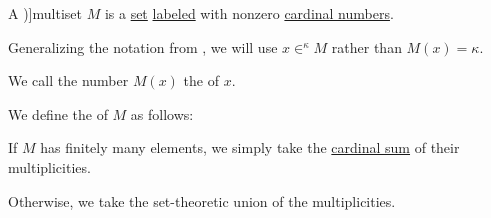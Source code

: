 \begin{definition}\label{def:multiset}
  A \term[ru=мультимножество (\incite[28]{Новиков2013})]{multiset} \( M \) is a \hyperref[def:set]{set} \hyperref[def:labeled_set]{labeled} with nonzero \hyperref[def:cardinal]{cardinal numbers}.

  Generalizing the notation from , we will use \( x \in^\kappa M \) rather than \( M(x) = \kappa \).

  \begin{thmenum}
     We call the number \( M(x) \) the  of \( x \).

    \mimprovised We define the  of \( M \) as follows:
    \begin{thmenum}
       If \( M \) has finitely many elements, we simply take the \hyperref[def:cardinal_arithmetic/addition]{cardinal sum} of their multiplicities.

       Otherwise, we take the set-theoretic union of the multiplicities.
    \end{thmenum}
  \end{thmenum}
\end{definition}
